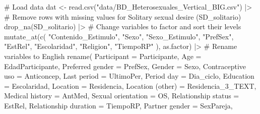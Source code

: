 \documentclass[
  bookmarksnumbered]{article}
\newenvironment{Shaded}{\begin{snugshade}}{\end{snugshade}}
\newcommand{\AttributeTok}[1]{\textcolor[rgb]{0.80,0.80,0.80}{#1}}
\newcommand{\CommentTok}[1]{\textcolor[rgb]{0.50,0.62,0.50}{#1}}
\newcommand{\FunctionTok}[1]{\textcolor[rgb]{0.94,0.94,0.56}{#1}}
\newcommand{\NormalTok}[1]{\textcolor[rgb]{0.80,0.80,0.80}{#1}}
\newcommand{\OtherTok}[1]{\textcolor[rgb]{0.94,0.94,0.56}{#1}}
\newcommand{\SpecialCharTok}[1]{\textcolor[rgb]{0.86,0.64,0.64}{#1}}
\newcommand{\StringTok}[1]{\textcolor[rgb]{0.80,0.58,0.58}{#1}}
\begin{document}
\begin{Shaded}
\begin{Highlighting}[]
\CommentTok{\# Load data}
\NormalTok{dat }\OtherTok{\textless{}{-}} \FunctionTok{read.csv}\NormalTok{(}\StringTok{"data/BD\_Heterosexuales\_Vertical\_BIG.csv"}\NormalTok{) }\SpecialCharTok{|\textgreater{}}
  \CommentTok{\# Remove rows with missing values for Solitary sexual desire (SD\_solitario)}
  \FunctionTok{drop\_na}\NormalTok{(SD\_solitario) }\SpecialCharTok{|\textgreater{}}
  \CommentTok{\# Change variables to factor and sort their levels}
  \FunctionTok{mutate\_at}\NormalTok{(}\FunctionTok{c}\NormalTok{(}
    \StringTok{"Contenido\_Estimulo"}\NormalTok{, }\StringTok{"Sexo"}\NormalTok{, }\StringTok{"Sexo\_Estimulo"}\NormalTok{, }\StringTok{"PrefSex"}\NormalTok{, }\StringTok{"EstRel"}\NormalTok{, }\StringTok{"Escolaridad"}\NormalTok{,}
    \StringTok{"Religion"}\NormalTok{, }\StringTok{"TiempoRP"}
\NormalTok{  ), as.factor) }\SpecialCharTok{|\textgreater{}}
  \CommentTok{\# Rename variables to English}
  \FunctionTok{rename}\NormalTok{(}
    \AttributeTok{Participant =}\NormalTok{ Participante,}
    \AttributeTok{Age =}\NormalTok{ EdadParticipante,}
    \StringTok{\textasciigrave{}}\AttributeTok{Preferred gender}\StringTok{\textasciigrave{}} \OtherTok{=}\NormalTok{ PrefSex,}
    \AttributeTok{Gender =}\NormalTok{ Sexo,}
    \StringTok{\textasciigrave{}}\AttributeTok{Contraceptive uso}\StringTok{\textasciigrave{}} \OtherTok{=}\NormalTok{ Anticoncep,}
    \StringTok{\textasciigrave{}}\AttributeTok{Last period}\StringTok{\textasciigrave{}} \OtherTok{=}\NormalTok{ UltimoPer,}
    \StringTok{\textasciigrave{}}\AttributeTok{Period day}\StringTok{\textasciigrave{}} \OtherTok{=}\NormalTok{ Dia\_ciclo,}
    \AttributeTok{Education =}\NormalTok{ Escolaridad,}
    \AttributeTok{Location =}\NormalTok{ Residencia,}
    \StringTok{\textasciigrave{}}\AttributeTok{Location (other)}\StringTok{\textasciigrave{}} \OtherTok{=}\NormalTok{ Residencia\_3\_TEXT,}
    \StringTok{\textasciigrave{}}\AttributeTok{Medical history}\StringTok{\textasciigrave{}} \OtherTok{=}\NormalTok{ AntMed,}
    \StringTok{\textasciigrave{}}\AttributeTok{Sexual orientation}\StringTok{\textasciigrave{}} \OtherTok{=}\NormalTok{ OS,}
    \StringTok{\textasciigrave{}}\AttributeTok{Relationship status}\StringTok{\textasciigrave{}} \OtherTok{=}\NormalTok{ EstRel,}
    \StringTok{\textasciigrave{}}\AttributeTok{Relationship duration}\StringTok{\textasciigrave{}} \OtherTok{=}\NormalTok{ TiempoRP,}
    \StringTok{\textasciigrave{}}\AttributeTok{Partner gender}\StringTok{\textasciigrave{}} \OtherTok{=}\NormalTok{ SexPareja,}

\end{Highlighting}
\end{Shaded}
\end{document}
